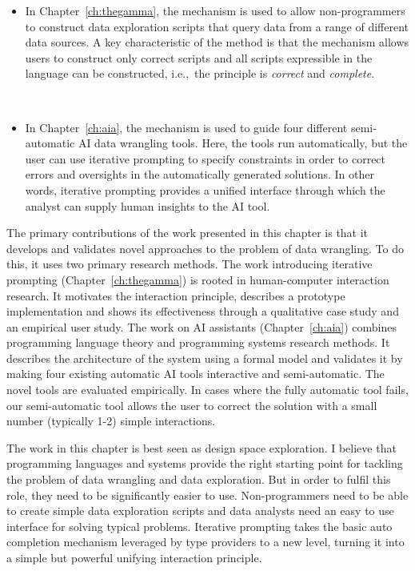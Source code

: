 \documentclass[fleqn,11pt]{report}
\theoremstyle{definition}
\newenvironment{nitemize}
{ \vspace{-0.4em}
  \begin{itemize}
    \setlength{\itemsep}{5pt}
    \setlength{\parskip}{0pt}
    \setlength{\parsep}{0pt} }
{ \end{itemize}
  \vspace{-0.4em} }
\begin{document}
\begin{nitemize}
\item In Chapter~\ref{ch:thegamma}, the mechanism is used to allow non-programmers to construct
  data exploration scripts that query data from a range of different data sources. A key
  characteristic of the method is that the mechanism allows users to construct only correct
  scripts and all scripts expressible in the language can be constructed, i.e.,~the principle
  is \emph{correct} and \emph{complete}.

~

\item In Chapter~\ref{ch:aia}, the mechanism is used to guide four different semi-automatic AI data
  wrangling tools. Here, the tools run automatically, but the user can use iterative prompting
  to specify constraints in order to correct errors and oversights in the automatically
  generated solutions. In other words, iterative prompting provides a unified interface through
  which the analyst can supply human insights to the AI tool.
\end{nitemize}

The primary contributions of the work presented in this chapter is that it develops and validates
novel approaches to the problem of data wrangling. To do this, it uses two primary research
methods. The work introducing iterative prompting (Chapter~\ref{ch:thegamma}) is rooted in
human-computer interaction research. It motivates the interaction principle, describes a prototype
implementation and shows its effectiveness through a qualitative case study and an empirical user
study. The work on AI assistants (Chapter~\ref{ch:aia}) combines programming language theory and
programming systems research methods. It describes the architecture of the system using a formal
model and validates it by making four existing automatic
AI tools interactive and semi-automatic. The novel tools are evaluated empirically. In cases where
the fully automatic tool fails, our semi-automatic tool allows the user to correct the solution
with a small number (typically 1-2) simple interactions.

The work in this chapter is best seen as design space exploration.
I believe that programming languages and systems provide the right starting point for tackling the
problem of data wrangling and data exploration. But in order to fulfil this role, they need to
be significantly easier to use. Non-programmers need to be able to create simple data exploration
scripts and data analysts need an easy to use interface for solving typical problems.
Iterative prompting takes the basic auto completion mechanism leveraged by type providers
to a new level, turning it into a simple but powerful unifying interaction principle.
\end{document}
